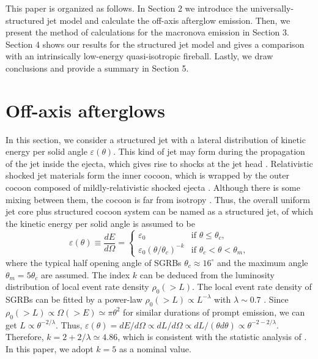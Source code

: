 \documentclass{emulateapj}
\def\beq{\begin{equation}}
\def\enq{\end{equation}}
\begin{document}
This paper is organized as follows. In Section 2 we introduce the universally-structured jet model and calculate the off-axis afterglow emission. Then, we present the method of calculations for the macronova emission in Section 3. Section 4 shows our results for the structured jet model and gives a comparison with an intrinsically low-energy quasi-isotropic fireball. Lastly, we draw conclusions and provide a summary in Section 5.


\section{Off-axis afterglows}
In this section, we consider a structured jet with a lateral distribution of kinetic energy per solid angle $\varepsilon(\theta)$. This kind of jet may form during the propagation of the jet inside the ejecta, which gives rise to shocks at the jet head \citep{nag14, nak17}. Relativistic shocked jet materials form the inner cocoon, which is wrapped by the outer cocoon composed of mildly-relativistic shocked ejecta \citep{got17, nak17, laz17a, laz17b}. Although there is some mixing between them, the cocoon is far from isotropy \citep{nak17, laz17b}. Thus, the overall uniform jet core plus structured cocoon system can be named as a structured jet, of which the kinetic energy per solid angle is assumed to be \citep{dai01, zhang02, ros02, kum03}
\beq
\varepsilon(\theta)\equiv\frac{dE}{d\Omega}=\begin{cases}
\varepsilon_0 & \text{if} \,\,\theta\leq\theta_c, \\
\varepsilon_0(\theta/\theta_c)^{-k} & \text{if}\,\, \theta_c<\theta<\theta_m,
\end{cases}
\label{eq:Edis}
\enq
where the typical half opening angle of SGRBs $\theta_c\approx 16^{\circ}$ \citep{fong15} and the maximum angle $\theta_m=5\theta_c$ are assumed. The index $k$ can be deduced from the luminosity distribution of local event rate density $\rho_0(>L)$. The local event rate density of SGRBs can be fitted by a power-law $\rho_0(>L)\propto L^{-\lambda}$ with $\lambda\sim0.7$ \citep{sun15}. Since $\rho_0(>L)\propto\Omega(>E)\simeq\pi\theta^2$ for similar durations of prompt emission, we can get $L\propto\theta^{-2/\lambda}$. Thus, $\varepsilon(\theta)=dE/d\Omega\propto dL/d\Omega\propto dL/(\theta d\theta)\propto \theta^{-2-2/\lambda}$. Therefore, $k=2+2/\lambda\simeq4.86$, which is consistent with the statistic analysis of \cite{Pes15}. In this paper, we adopt $k=5$ as a nominal value.
\end{document}
